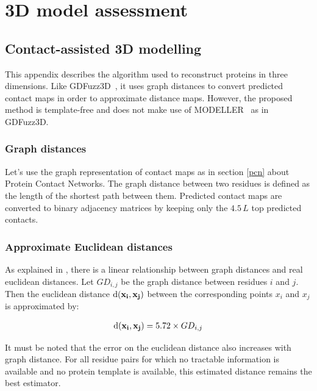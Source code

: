 \chapter{3D model assessment}

    \section{Contact-assisted 3D modelling}

    This appendix describes the algorithm used to reconstruct
    proteins in three dimensions. Like GDFuzz3D~\cite{pietal2015gdfuzz3d},
    it uses graph distances to convert predicted contact maps
    in order to approximate distance maps. However, the proposed method is template-free
    and does not make use of MODELLER~\cite{modeller} as in GDFuzz3D.

    \subsection{Graph distances}

        Let's use the graph representation of contact maps as in section \ref{pcn}
        about Protein Contact Networks.
        The graph distance between two residues is defined as the length of
        the shortest path between them.
        Predicted contact maps are converted to binary adjacency matrices
        by keeping only the $4.5\,L$ top predicted contacts.

    \subsection{Approximate Euclidean distances}

        As explained in \cite{pietal2015gdfuzz3d}, there is a linear relationship
        between graph distances and real euclidean distances.
        Let $GD_{i,j}$ be the graph distance between residues $i$ and $j$. Then
        the euclidean distance $\operatorname{d}(\mathbf{x_i},\mathbf{x_j})$ between the corresponding
        points $x_i$ and $x_j$ is approximated by:

        \begin{align}
            \operatorname{d}(\mathbf{x_i},\mathbf{x_j}) = 5.72 \times GD_{i,j}
        \end{align}

        It must be noted that the error on the euclidean distance also increases
        with graph distance. For all residue pairs for which no tractable information
        is available and no protein template is available,
        this estimated distance remains the best estimator.

